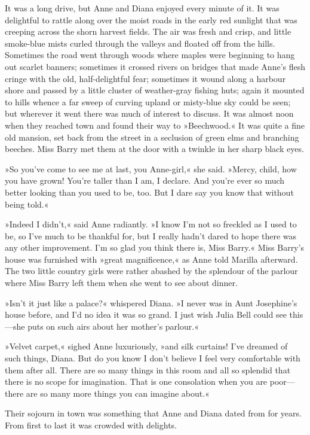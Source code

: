 It was a long drive, but Anne and Diana enjoyed every minute of it. It was delightful to rattle along over the moist roads in the early red sunlight that was creeping across the shorn harvest fields. The air was fresh and crisp, and little smoke-blue mists curled through the valleys and floated off from the hills. Sometimes the road went through woods where maples were beginning to hang out scarlet banners; sometimes it crossed rivers on bridges that made Anne's flesh cringe with the old, half-delightful fear; sometimes it wound along a harbour shore and passed by a little cluster of weather-gray fishing huts; again it mounted to hills whence a far sweep of curving upland or misty-blue sky could be seen; but wherever it went there was much of interest to discuss. It was almost noon when they reached town and found their way to »Beechwood.« It was quite a fine old mansion, set back from the street in a seclusion of green elms and branching beeches. Miss Barry met them at the door with a twinkle in her sharp black eyes.

»So you've come to see me at last, you Anne-girl,« she said. »Mercy, child, how you have grown! You're taller than I am, I declare. And you're ever so much better looking than you used to be, too. But I dare say you know that without being told.«

»Indeed I didn't,« said Anne radiantly. »I know I'm not so freckled as I used to be, so I've much to be thankful for, but I really hadn't dared to hope there was any other improvement. I'm so glad you think there is, Miss Barry.« Miss Barry's house was furnished with »great magnificence,« as Anne told Marilla afterward. The two little country girls were rather abashed by the splendour of the parlour where Miss Barry left them when she went to see about dinner.

»Isn't it just like a palace?« whispered Diana. »I never was in Aunt Josephine's house before, and I'd no idea it was so grand. I just wish Julia Bell could see this—she puts on such airs about her mother's parlour.«

»Velvet carpet,« sighed Anne luxuriously, »and silk curtains! I've dreamed of such things, Diana. But do you know I don't believe I feel very comfortable with them after all. There are so many things in this room and all so splendid that there is no scope for imagination. That is one consolation when you are poor—there are so many more things you can imagine about.«

Their sojourn in town was something that Anne and Diana dated from for years. From first to last it was crowded with delights.

